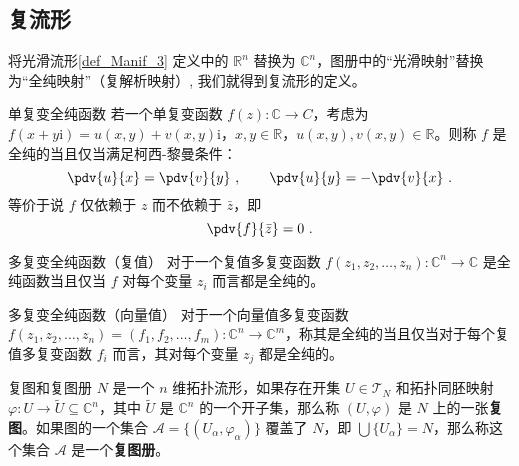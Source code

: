 

\subsection{复流形}

将光滑流形\autoref{def_Manif_3} 定义中的 $\mathbb{R}^n$ 替换为 $\mathbb{C}^n$，图册中的“光滑映射”替换为“全纯映射”（复解析映射）, 我们就得到复流形的定义。

\begin{definition}{单复变全纯函数}
若一个单复变函数 $f(z): \mathbb C \to C$，考虑为 $f(x+y \mathrm i)=u(x, y) + v(x, y) \mathrm i$，$x, y\in \mathbb R$，$u(x, y), v(x, y) \in \mathbb R$。则称 $f$ 是全纯的当且仅当满足柯西-黎曼条件：
\begin{equation}
    \pdv{u}{x} = \pdv{v}{y}~,\qquad \pdv{u}{y} = -\pdv{v}{x} ~.
\end{equation}
等价于说 $f$ 仅依赖于 $z$ 而不依赖于 $\bar{z}$，即
\begin{equation}
\pdv{f}{\bar{z}} = 0 ~.
\end{equation}

\end{definition}

\begin{definition}{多复变全纯函数（复值）}
对于一个复值多复变函数 $f(z_1, z_2, \dots, z_n): \mathbb C^n \to \mathbb C$ 是全纯函数当且仅当 $f$ 对每个变量 $z_i$ 而言都是全纯的。
\end{definition}

\begin{definition}{多复变全纯函数（向量值）}
对于一个向量值多复变函数 $f(z_1, z_2, \dots, z_n) = (f_1, f_2, \dots, f_m): \mathbb C^n \to \mathbb C^m$，称其是全纯的当且仅当对于每个复值多复变函数 $f_i$ 而言，其对每个变量 $z_j$ 都是全纯的。
\end{definition}



\begin{definition}{复图和复图册}
$N$ 是一个 $n$ 维拓扑流形，如果存在开集 $U \in \mathcal{T}_N$ 和拓扑同胚映射 $\varphi: U \rightarrow \tilde{U} \subseteq \mathbb{C}^n$，其中 $\tilde{U}$ 是 $\mathbb{C}^n$ 的一个开子集，那么称 $(U,\varphi)$ 是 $N$ 上的一张\textbf{复图}。如果图的一个集合 $\mathcal{A}=\{(U_\alpha, \varphi_\alpha)\}$ 覆盖了 $N$，即 $\bigcup\{U_\alpha\}=N$，那么称这个集合 $\mathcal{A}$ 是一个\textbf{复图册}。
\end{definition}

